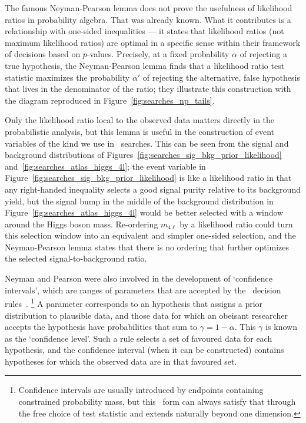 The famous Neyman-Pearson lemma does not prove the usefulness of likelihood
ratios in probability algebra.
That was already known.
What it contributes is a relationship with one-sided inequalities ---
it states that likelihood ratios (not maximum likelihood ratios)
are optimal in a specific sense within their framework of decisions
based on $p$-values.
Precisely, at a fixed probability $\alpha$ of rejecting a true hypothesis,
the Neyman-Pearson lemma finds that a likelihood ratio test statistic maximizes
the probability $\alpha'$ of rejecting the alternative, false hypothesis that
lives in the denominator of the ratio; they illustrate this construction with
the diagram reproduced in Figure~\ref{fig:searches_np_tails}.

Only the likelihood ratio local to the observed data matters directly in the
probabilistic analysis, but this lemma is useful in the construction
of event variables of the kind we use in \atlas\ searches.
This can be seen from the signal and background distributions of
Figures~\ref{fig:searches_sig_bkg_prior_likelihood}
and~\ref{fig:searches_atlas_higgs_4l};
the event variable in Figure~\ref{fig:searches_sig_bkg_prior_likelihood} is
like a likelihood ratio in that any right-handed inequality selects a good
signal purity relative to its background yield, but the signal bump in the
middle of the background distribution in
Figure~\ref{fig:searches_atlas_higgs_4l} would be better selected with a
window around the Higgs boson mass.
Re-ordering $m_{4\ell}$ by a likelihood ratio could turn this selection window
into an equivalent and simpler one-sided selection, and the Neyman-Pearson
lemma states that there is no ordering that further optimizes the selected
signal-to-background ratio.

Neyman and Pearson were also involved in the development of
`confidence intervals', which are ranges of parameters that are
accepted by the \pvalue\ decision rules~\cite{
clopper1934confidence,
neyman1935Intervals,
Neyman1937Outline
}.%
\footnote{%
Confidence intervals are usually introduced by endpoints containing constrained
probability mass, but this \pvalue\ form can always satisfy that through the
free choice of test statistic and extends naturally beyond one dimension.%
}
A parameter corresponds to an hypothesis that assigns a prior distribution to
plausible data, and those data for which an obeisant researcher accepts the
hypothesis have probabilities that sum to $\gamma = 1 - \alpha$.
This $\gamma$ is known as the `confidence level'.
Such a rule selects a set of favoured data for each hypothesis, and the
confidence interval (when it can be constructed) contains hypotheses for which
the observed data are in that favoured set.


